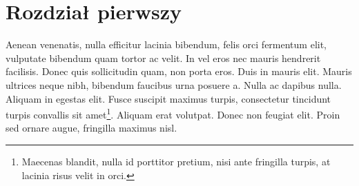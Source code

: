 \documentclass[polish,engineering]{wizthesis}
\begin{document}
\chapter{Rozdział pierwszy}

Aenean venenatis, nulla efficitur lacinia bibendum, felis orci fermentum elit, vulputate bibendum quam tortor ac velit. In vel eros nec mauris hendrerit facilisis. Donec quis sollicitudin quam, non porta eros. Duis in mauris elit. Mauris ultrices neque nibh, bibendum faucibus urna posuere a. Nulla ac dapibus nulla. Aliquam in egestas elit. Fusce suscipit maximus turpis, consectetur tincidunt turpis convallis sit amet\footnote{Maecenas blandit, nulla id porttitor pretium, nisi ante fringilla turpis, at lacinia risus velit in orci.}. Aliquam erat volutpat. Donec non feugiat elit. Proin sed ornare augue, fringilla maximus nisl.
\end{document}
